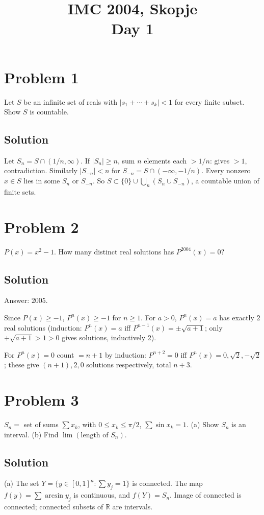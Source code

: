 \documentclass{article}
\title{IMC 2004, Skopje \\ Day 1}
\date{}
\begin{document}
\maketitle

\section*{Problem 1}
Let $S$ be an infinite set of reals with $|s_1 + \cdots + s_k| < 1$ for every finite subset. Show $S$ is countable.

\subsection*{Solution}
Let $S_n = S \cap (1/n, \infty)$. If $|S_n| \ge n$, sum $n$ elements each $> 1/n$: gives $> 1$, contradiction. Similarly $|S_{-n}| < n$ for $S_{-n} = S \cap (-\infty, -1/n)$. Every nonzero $x \in S$ lies in some $S_n$ or $S_{-n}$. So $S \subset \{0\} \cup \bigcup_n (S_n \cup S_{-n})$, a countable union of finite sets.

\section*{Problem 2}
$P(x) = x^2 - 1$. How many distinct real solutions has $P^{2004}(x) = 0$?

\subsection*{Solution}
Answer: $2005$.

Since $P(x) \ge -1$, $P^n(x) \ge -1$ for $n \ge 1$. For $a > 0$, $P^n(x) = a$ has exactly $2$ real solutions (induction: $P^n(x) = a$ iff $P^{n-1}(x) = \pm\sqrt{a+1}$; only $+\sqrt{a+1} > 1 > 0$ gives solutions, inductively 2).

For $P^n(x) = 0$ count $= n + 1$ by induction: $P^{n+2} = 0$ iff $P^n(x) = 0, \sqrt 2, -\sqrt 2$; these give $(n+1), 2, 0$ solutions respectively, total $n + 3$.

\section*{Problem 3}
$S_n = $ set of sums $\sum x_k$, with $0 \le x_k \le \pi/2$, $\sum \sin x_k = 1$. (a) Show $S_n$ is an interval. (b) Find $\lim (\text{length of } S_n)$.

\subsection*{Solution}
(a) The set $Y = \{y \in [0,1]^n : \sum y_j = 1\}$ is connected. The map $f(y) = \sum \arcsin y_j$ is continuous, and $f(Y) = S_n$. Image of connected is connected; connected subsets of $\mathbb{R}$ are intervals.
\end{document}
